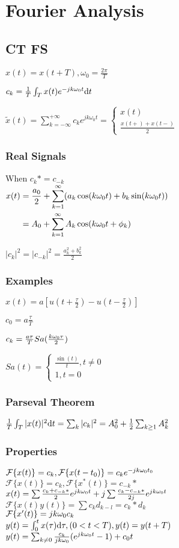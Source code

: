 \section{Fourier Analysis}
\subsection*{CT FS}
$x(t)=x(t+T), \omega_0=\frac{2\pi}{T}$

$c_k=\frac 1 T \int_T x(t) e^{-jk\omega_0 t} \mathrm{d} t$

$\tilde{x}(t)=\sum_{k=-\infty}^{+\infty} c_k e^{jk\omega_0 t}=\begin{cases}x(t)\\ \frac{x(t+)+x(t-)}2\end{cases}$
\subsubsection*{Real Signals}
When $c_k*=c_{-k}$\\
$\begin{aligned}
x(t)&=\frac{a_0}{2} + \sum_{k=1}^{\infty} (a_k \cos(k\omega_0t)+b_k\sin(k \omega_0 t)) \\
&=A_0+\sum_{k=1}^{\infty} A_k\cos(k\omega_0 t+\phi_k)
\end{aligned}$

$|c_k|^2=|c_{-k}|^2=\frac{a_k^2+b_k^2}{2}$

\subsubsection*{Examples}
$x(t)=a[u(t+\frac\tau 2) - u(t-\frac\tau 2)]$

$c_0=a\frac\tau T$

$c_k=\frac{a\tau}{T} Sa(\frac{k\omega_0\tau}{2})$

$Sa(t)=\begin{cases}\frac{\sin(t)}{t}, t\ne 0\\1, t=0\end{cases}$

\subsubsection*{Parseval Theorem}

$\frac  1 T \int_T |x(t)|^2\mathrm{d} t = \sum_k |c_k|^2=A_0^2+\frac 1 2\sum_{k\ge 1} A_k^2$

\subsubsection*{Properties}
$\mathcal{F}\{x(t)\}=c_k,\mathcal{F}\{x(t-t_0)\}=c_ke^{-jk\omega_0 t_0}$\\
$\mathcal{F}\{x(t)\}=c_k,\mathcal{F}\{x^*(t)\}=c_{-k}*$\\
$x(t)= \sum \frac{c_k+c_{-k}*}{2}e^{jk\omega_0t} + j \sum \frac{c_k-c_{-k}*}{2j}e^{jk\omega_0t}$ \\
$\mathcal{F}\{x(t)y(t)\}=\sum c_kd_{k-l}=c_k*d_k$\\
$\mathcal{F}\{x'(t)\}=jk\omega_0c_k$\\
$y(t)=\int_0^{t}x(\tau)\mathrm{d} \tau, (0<t<T), y(t)=y(t+T)$\\$y(t)=\sum_{k\ne 0} \frac{c_k}{jk\omega_0}(e^{jk\omega_0 t} - 1) + c_0t$

